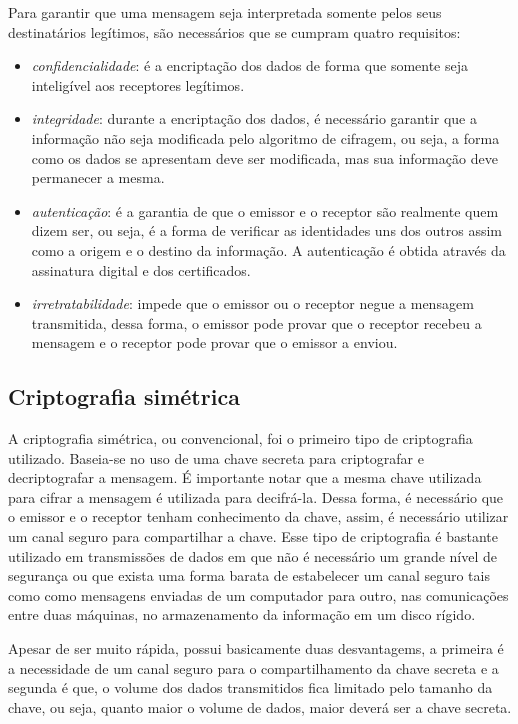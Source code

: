 Para garantir que uma mensagem seja interpretada somente pelos seus destinatários legítimos, são necessários que se cumpram quatro requisitos: \cite{Portnoi:2005}

\begin{itemize}
\item \textit{confidencialidade}: é a encriptação dos dados de forma que somente seja inteligível aos receptores legítimos.
\item \textit{integridade}: durante a encriptação dos dados, é necessário garantir que a informação não seja modificada pelo algoritmo de cifragem, ou seja, a forma como os dados se apresentam deve ser modificada, mas sua informação deve permanecer a mesma.
\item \textit{autenticação}: é a garantia de que o emissor e o receptor são realmente quem dizem ser, ou seja, é a forma de verificar as identidades uns dos outros assim como a origem e o destino da informação. A autenticação é obtida através da assinatura digital e dos certificados.
\item \textit{irretratabilidade}: impede que o emissor ou o receptor negue a mensagem transmitida, dessa forma, o emissor pode provar que o receptor recebeu a mensagem e o receptor pode provar que o emissor a enviou.
\end{itemize}

%
%
\subsection{Criptografia simétrica}
A criptografia simétrica, ou convencional, foi o primeiro tipo de criptografia utilizado. Baseia-se no uso de uma chave secreta para criptografar e decriptografar a mensagem. É importante notar que a mesma chave utilizada para cifrar a mensagem é utilizada para decifrá-la. Dessa forma, é necessário que o emissor e o receptor tenham conhecimento da chave, assim, é necessário utilizar um canal seguro para compartilhar a chave. Esse tipo de criptografia é bastante utilizado em transmissões de dados em que não é necessário um grande nível de segurança ou que exista uma forma barata de estabelecer um canal seguro tais como como mensagens enviadas de um computador para outro, nas comunicações entre duas máquinas, no armazenamento da informação em um disco rígido. \cite{Cavalcante:2015}

Apesar de ser muito rápida, possui basicamente duas desvantagems, a primeira é a necessidade de um canal seguro para o compartilhamento da chave secreta e a segunda é que, o volume dos dados transmitidos fica limitado pelo tamanho da chave, ou seja, quanto maior o volume de dados, maior deverá ser a chave secreta.

